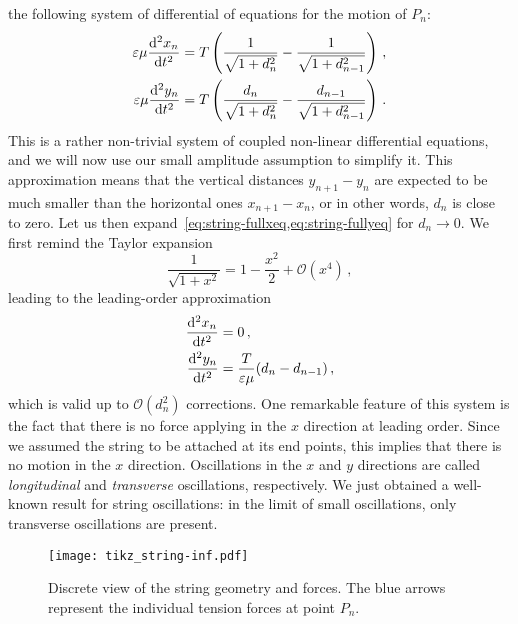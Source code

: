 the following system of differential of equations for the motion of $P_n$:
\begin{align}
  \varepsilon\mu \frac{\mathrm{d}^2 x_n}{\mathrm{d} t^2}&=
  T\left(\frac{1}{\sqrt{1+d_{\smash{n}}^2}}-\frac{1}{\sqrt{1+d_{\smash{n-1}}^2}}\right)\,,
  \label{eq:string-fullxeq}\\
  \varepsilon\mu \frac{\mathrm{d}^2 y_n}{\mathrm{d} t^2}&=
  T\left(\frac{d_n}{\sqrt{1+d_{\smash{n}}^2}}-\frac{d_{\smash{n-1}}}{\sqrt{1+d_{\smash{n-1}}^2}}\right)\,.
  \label{eq:string-fullyeq}
\end{align}
This is a rather non-trivial system of coupled non-linear differential equations, and we
will now use our small amplitude assumption to simplify it. This approximation means that
the vertical distances $y_{n+1}-y_n$ are expected to be much smaller than the horizontal
ones $x_{n+1}-x_n$, or in other words, $d_n$ is close to zero. Let us then
expand~\cref{eq:string-fullxeq,eq:string-fullyeq} for $d_n\to 0$. We first remind the
Taylor expansion
\begin{equation}
  \frac{1}{\sqrt{1+x^2}}=1-\frac{x^2}{2}+\mathcal{O}(x^4)\,,
\end{equation}
leading to the leading-order approximation
\begin{align}
  \frac{\mathrm{d}^2 x_n}{\mathrm{d} t^2}&=0\,,\label{eq:string-loxeq}\\
  \frac{\mathrm{d}^2 y_n}{\mathrm{d} t^2}&=\frac{T}{\varepsilon\mu}(d_{n}-d_{n-1})\,,\label{eq:string-loyeq}
\end{align}
which is valid up to $\mathcal{O}(d_n^2)$ corrections. One remarkable feature of this
system is the fact that there is no force applying in the $x$ direction at leading order.
Since we assumed the string to be attached at its end points, this implies that there is
no motion in the $x$ direction. Oscillations in the $x$ and $y$ directions are called
\emph{longitudinal} and \emph{transverse} oscillations, respectively. We just obtained a
well-known result for string oscillations: in the limit of small oscillations, only
transverse oscillations are present.
\begin{figure}[t]
  \centering
  \texttt{[image: tikz\_string-inf.pdf]}
  \caption{Discrete view of the string geometry and forces. The blue arrows represent the
  individual tension forces at point $P_n$.}
  \label{fig:string-inf}
\end{figure}

